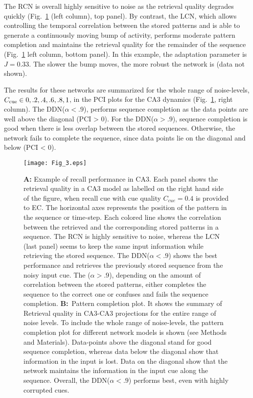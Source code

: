 \documentclass[utf8]{frontiersSCNS} %
\begin{document}
The RCN is overall highly sensitive to noise as the retrieval quality degrades quickly (Fig.~\ref{Fig_3} (left column), top panel). By contrast, the LCN, which allows controlling the temporal correlation between the stored patterns and is able to generate a continuously moving bump of activity, performs moderate pattern completion and maintains the retrieval quality for the remainder of the sequence (Fig.~\ref{Fig_3} left column, bottom panel).
In this example, the adaptation parameter is $J = 0.33$. The slower the bump moves, the more robust the network is (data not shown).
 
The results for these networks are summarized for the whole range of noise-levels, $C_{\rm cue} \in  { 0, .2, .4, .6, .8, 1 } $, in the PCI plots for the CA3 dynamics (Fig.~\ref{Fig_3}, right column). 
% 
The DDN($\alpha < .9 $), performs sequence completion as the data points are well above the diagonal (PCI > 0). For the DDN($\alpha > .9 $), sequence completion is good when there is less overlap between the stored sequences. Otherwise, the network fails to complete the sequence, since data points lie on the diagonal and below (PCI < 0).  
%
\begin{figure}[!htb]
\centering\texttt{[image: Fig\_3.eps]}
\caption{\textbf{A:} Example of recall performance in CA3. 
Each panel shows the retrieval quality in a CA3 model as labelled on the right hand side of the figure, when recall cue with cue quality $C_{cue} = 0.4$ is provided to EC.
The horizontal axes represents the position of the pattern in the sequence or time-step. Each colored line shows the correlation between the retrieved and the corresponding stored patterns in a sequence.
The RCN is highly sensitive to noise, whereas the LCN (last panel) seems to keep the same input information while retrieving the stored sequence. 
The DDN($\alpha < .9$) shows the best performance and retrieves the previously stored sequence from the noisy input cue. The ($\alpha > .9$), depending on the amount of correlation between the stored patterns, either completes the sequence to the correct one or confuses and fails the sequence completion.
\textbf{B:}~Pattern completion plot. It shows the summary of Retrieval quality in CA3-CA3 projections for the entire range of noise levels.
To include the whole range of noise-levels, the pattern completion plot for different network models is shown (see Methods and Materials). Data-points above the diagonal stand for good sequence completion, whereas data below the diagonal show that information in the input is lost. Data on the diagonal show that the network maintains the information in the input cue along the sequence. Overall, the DDN($\alpha < .9$) performs best, even with highly corrupted cues. 
 }
\label{Fig_3}
\end{figure}
\end{document}
